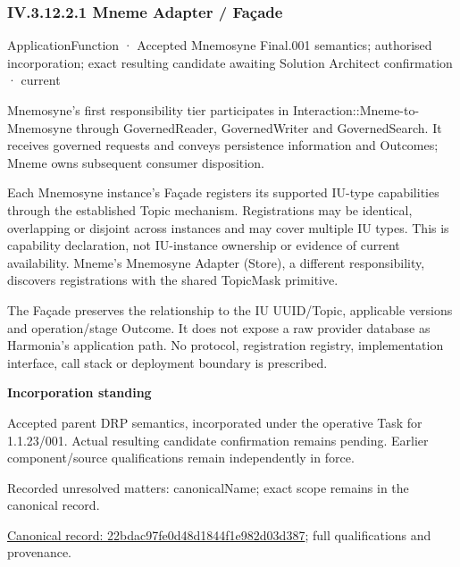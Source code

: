 \subsubsection*{IV.3.12.2.1 Mneme Adapter / Façade}
\label{navigation:IV.3.12.2.1}

\label{element:22bdac97fe0d48d1844f1e982d03d387}
{\small ApplicationFunction · Accepted Mnemosyne Final.001 semantics; authorised incorporation; exact resulting candidate awaiting Solution Architect confirmation · current}\par

Mnemosyne's first responsibility tier participates in Interaction::Mneme-to-Mnemosyne through GovernedReader, GovernedWriter and GovernedSearch. It receives governed requests and conveys persistence information and Outcomes; Mneme owns subsequent consumer disposition.



Each Mnemosyne instance's Façade registers its supported IU-type capabilities through the established Topic mechanism. Registrations may be identical, overlapping or disjoint across instances and may cover multiple IU types. This is capability declaration, not IU-instance ownership or evidence of current availability. Mneme's Mnemosyne Adapter (Store), a different responsibility, discovers registrations with the shared TopicMask primitive.



The Façade preserves the relationship to the IU UUID/Topic, applicable versions and operation/stage Outcome. It does not expose a raw provider database as Harmonia's application path. No protocol, registration registry, implementation interface, call stack or deployment boundary is prescribed.



\par\medskip\textbf{Incorporation standing}\par


Accepted parent DRP semantics, incorporated under the operative Task for 1.1.23/001. Actual resulting candidate confirmation remains pending. Earlier component/source qualifications remain independently in force.


{\small Recorded unresolved matters: canonicalName; exact scope remains in the canonical record.}\par
{\footnotesize \href{../../../../continuum/application/application-function/22bdac97fe0d48d1844f1e982d03d387.md}{Canonical record: 22bdac97fe0d48d1844f1e982d03d387}; full qualifications and provenance.}\par
